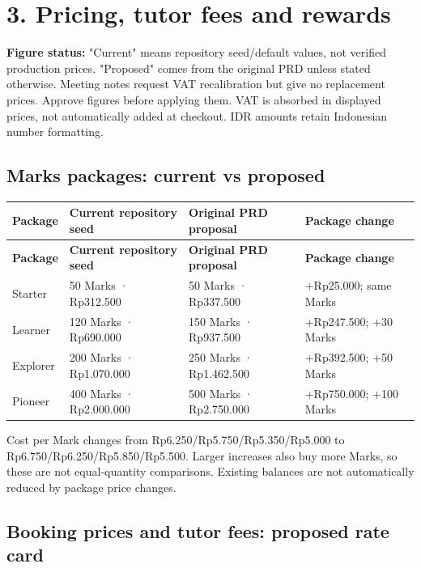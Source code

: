 \documentclass[11pt,a4paper]{article}
\begin{document}
\section*{3. Pricing, tutor fees and rewards}

\textbf{Figure status:} "Current" means repository seed/\allowbreak{}default values, not verified production prices. "Proposed" comes from the original PRD unless stated otherwise. Meeting notes request VAT recalibration but give no replacement prices. Approve figures before applying them. VAT is absorbed in displayed prices, not automatically added at checkout. IDR amounts retain Indonesian number formatting.

\subsection*{Marks packages: current vs proposed}

{\small
\begin{longtable}{|L{23.56mm}|L{41.23mm}|L{41.23mm}|L{41.23mm}|}
\hline
\textbf{Package} & \textbf{Current repository seed} & \textbf{Original PRD proposal} & \textbf{Package change} \\ \hline
\endfirsthead
\hline
\textbf{Package} & \textbf{Current repository seed} & \textbf{Original PRD proposal} & \textbf{Package change} \\ \hline
\endhead
Starter & 50 Marks · Rp312.500 & 50 Marks · Rp337.500 & +Rp25.000; same Marks \\ \hline
Learner & 120 Marks · Rp690.000 & 150 Marks · Rp937.500 & +Rp247.500; +30 Marks \\ \hline
Explorer & 200 Marks · Rp1.070.000 & 250 Marks · Rp1.462.500 & +Rp392.500; +50 Marks \\ \hline
Pioneer & 400 Marks · Rp2.000.000 & 500 Marks · Rp2.750.000 & +Rp750.000; +100 Marks \\ \hline
\end{longtable}
}

Cost per Mark changes from Rp6.250/\allowbreak{}Rp5.750/\allowbreak{}Rp5.350/\allowbreak{}Rp5.000 to Rp6.750/\allowbreak{}Rp6.250/\allowbreak{}Rp5.850/\allowbreak{}Rp5.500. Larger increases also buy more Marks, so these are not equal-quantity comparisons. Existing balances are not automatically reduced by package price changes.

\subsection*{Booking prices and tutor fees: proposed rate card}
\end{document}
